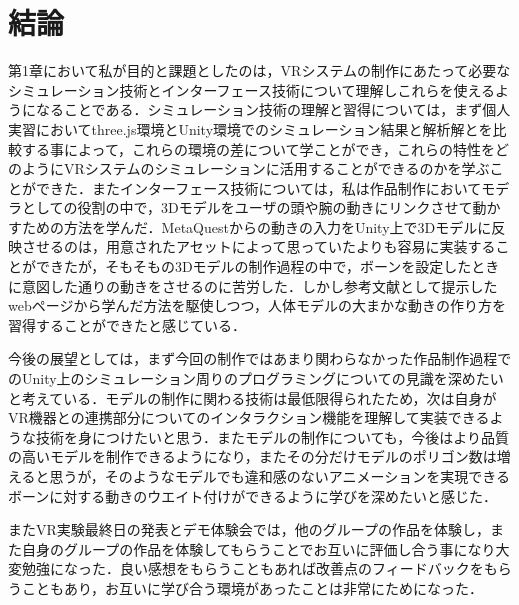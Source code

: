 \documentclass[12pt, xelatex,ja=standard,jafont=hiragino]{bxjsarticle}
\newif\ifdraft
\begin{document}
\section{結論}
\ifdraft
1章で実験を受講するにあたっての自分の目的と課題とした部分について、実験全体を通して評価を行う章である。目的と課題について、個人実習、グループ制作を通してどのような学びがあり、その課題、目的がどの程度達成できたのかを評価する。

また、主観的に、本実験を通して感じたことを記述してよい。ただし、単に面白かったとか、運営上の不備に関する不満を書くのではなく、この実験から何を学んだのか、何を感じたのか、学生としての見識ある感想・抱負等を期待する。
\fi
第1章において私が目的と課題としたのは，VRシステムの制作にあたって必要なシミュレーション技術とインターフェース技術について理解しこれらを使えるようになることである．シミュレーション技術の理解と習得については，まず個人実習においてthree.js環境とUnity環境でのシミュレーション結果と解析解とを比較する事によって，これらの環境の差について学ことができ，これらの特性をどのようにVRシステムのシミュレーションに活用することができるのかを学ぶことができた．またインターフェース技術については，私は作品制作においてモデラとしての役割の中で，3Dモデルをユーザの頭や腕の動きにリンクさせて動かすための方法を学んだ．MetaQuestからの動きの入力をUnity上で3Dモデルに反映させるのは，用意されたアセットによって思っていたよりも容易に実装することができたが，そもそもの3Dモデルの制作過程の中で，ボーンを設定したときに意図した通りの動きをさせるのに苦労した．しかし参考文献として提示したwebページから学んだ方法を駆使しつつ，人体モデルの大まかな動きの作り方を習得することができたと感じている．

今後の展望としては，まず今回の制作ではあまり関わらなかった作品制作過程でのUnity上のシミュレーション周りのプログラミングについての見識を深めたいと考えている．モデルの制作に関わる技術は最低限得られたため，次は自身がVR機器との連携部分についてのインタラクション機能を理解して実装できるような技術を身につけたいと思う．またモデルの制作についても，今後はより品質の高いモデルを制作できるようになり，またその分だけモデルのポリゴン数は増えると思うが，そのようなモデルでも違和感のないアニメーションを実現できるボーンに対する動きのウエイト付けができるように学びを深めたいと感じた．

またVR実験最終日の発表とデモ体験会では，他のグループの作品を体験し，また自身のグループの作品を体験してもらうことでお互いに評価し合う事になり大変勉強になった．良い感想をもらうこともあれば改善点のフィードバックをもらうこともあり，お互いに学び合う環境があったことは非常にためになった．
\end{document}
